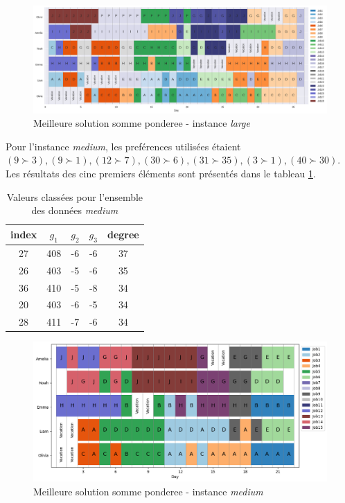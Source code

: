 \documentclass[12pt, a4paper, french, version=last, parskip=half, titlepage]{scrartcl}
\begin{document}
\begin{figure}[H]
\centering
\includegraphics[width=1\textwidth]{images/best_somme_pondere_large.png}
\caption{Meilleure solution somme ponderee - instance \emph{large}}
\label{fig:best_somme_ponderee_large}
\end{figure}    



Pour l'instance \emph{medium}, les preférences utilisées étaient $(9 \succ 3), (9 \succ 1), (12 \succ 7), (30 \succ 6), (31 \succ 35), (3 \succ 1), (40 \succ  30)$. Les résultats des cinc premiers éléments sont présentés dans le tableau \ref{tab:somme_pond_medium}.


\begin{table}[htbp]
\centering
\begin{tabular}{c c c c c}
\toprule
index & $g_1$ & $g_2$ & $g_3$ & degree \\
\midrule
27 & 408 & -6 & -6 & 37 \\
26 & 403 & -5 & -6 & 35 \\
36 & 410 & -5 & -8 & 34 \\
20 & 403 & -6 & -5 & 34 \\
28 & 411 & -7 & -6 & 34 \\
\bottomrule
\end{tabular}
\caption{Valeurs classées pour l’ensemble des données \emph{medium}}
\label{tab:somme_pond_medium}
\end{table}


\begin{figure}[H]
\centering
\includegraphics[width=1\textwidth]{images/best_somme_pondere_medium.png}
\caption{Meilleure solution somme ponderee - instance \emph{medium}}
\label{fig:best_somme_ponderee_medium}
\end{figure}    
\end{document}
